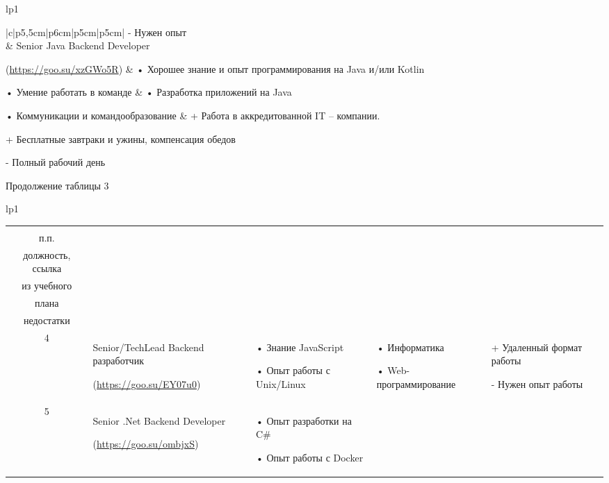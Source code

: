 \documentclass[14pt]{extreport}
\begin{document}
\begin{landscape}
\begin{longtable}[H]{lp{1\linewidth}}
\begin{small}
\begin{tabular}{|c|p{}|p{6cm}|p{5cm}|p{5cm}|}
-	Нужен опыт
\\

		& Senior Java Backend Developer
	
(\url{https://goo.su/xzGWo5R}) 	&
•	Хорошее знание и опыт программирования на Java и/или Kotlin

•	Умение работать в команде &
•	Разработка приложений на Java

•	Коммуникации и командообразование &
+	Работа в аккредитованной IT – компании.

+	Бесплатные завтраки и ужины, компенсация обедов

-	Полный рабочий день \\


	\hline


    \end{tabular}
    \end{small}
\end{longtable}

\newpage
Продолжение таблицы 3
\begin{longtable}[H]{lp{1\linewidth}}
\caption{Продолжение таблицы 3}

\centering

\begin{small}


    \begin{tabular}{|c|p{}|p{6cm}|p{5cm}|p{5cm}|}
	\hline 
	\makecell{№ \\ п.п.} &	\makecell{Наименование,\\ должность, ссылка} &	\makecell{Требования} & 	\makecell{Дисциплины \\ из учебного \\плана} &	\makecell{Преимущества и \\недостатки}  \\ 
	\hline 
	4	& Senior/TechLead Backend разработчик
	
(\url{https://goo.su/EY07u0}) &
•	Знание JavaScript

•	Опыт работы с Unix/Linux &
•	Информатика

•	Web-программирование &
+	Удаленный формат работы

-	Нужен опыт работы
\\



	\hline
	5	& Senior .Net Backend Developer
	
(\url{https://goo.su/ombjxS}) &
•	Опыт разработки на C\# 

•	Опыт работы с Docker


\end{tabular}
\end{small}
\end{longtable}
\end{landscape}
\end{document}
